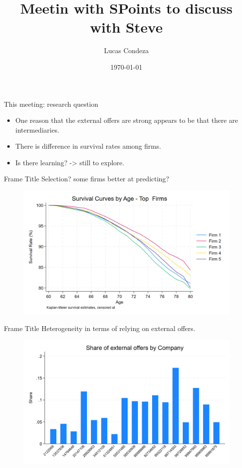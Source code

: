 \documentclass[10pt,aspectratio=169]{beamer}
\title{Meetin with SPoints to discuss with Steve}
\author{%
 Lucas Condeza
\inst{1} \and
}
\institute{
  \inst{1} Yale University \\
}
\date{\today}
\begin{document}








\begin{frame}{This meeting: research question}



 \begin{itemize}

        \item One reason that the external offers are strong appears to be that there are intermediaries. 
        
        \item There is difference in survival rates among firms. 
        
        \item Is there learning? -> still to explore. 



\end{itemize}
\end{frame}

\begin{frame}{Frame Title}
Selection? some firms better at predicting? 
 \begin{figure}
     \centering
     \includegraphics[width=0.6\linewidth]{figures//IE4/IE4_survival_curves_by_age_top_firms.png}
     \label{fig:placeholder}
 \end{figure}

\end{frame}
 

\begin{frame}{Frame Title}
Heterogeneity in terms of relying on external offers. 
 \begin{figure}
     \centering
     \includegraphics[width=0.6\linewidth]{figures//IE4/IE4_variation_share_external.png}
     \label{fig:placeholder}
 \end{figure}
\end{frame}
 
\end{document}
